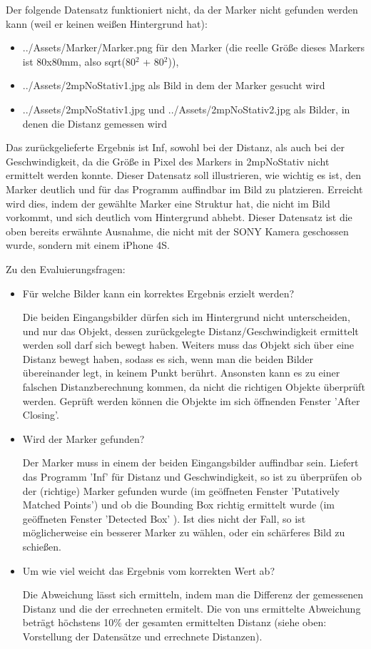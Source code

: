 \documentclass[deutsch]{scrartcl}
\begin{document}
Der folgende Datensatz funktioniert nicht, da der Marker nicht gefunden werden kann (weil er keinen weißen Hintergrund hat):
\begin{itemize}
	\item ../Assets/Marker/Marker.png für den Marker (die reelle Größe dieses Markers ist 80x80mm, also sqrt(80$^2$ + 80$^2$)), 
	\item ../Assets/2mpNoStativ1.jpg als Bild in dem der Marker gesucht wird
	\item ../Assets/2mpNoStativ1.jpg und ../Assets/2mpNoStativ2.jpg als Bilder, in denen die Distanz gemessen wird
\end{itemize}
Das zurückgelieferte Ergebnis ist Inf, sowohl bei der Distanz, als auch bei der Geschwindigkeit, da die Größe in Pixel des Markers in 2mpNoStativ nicht ermittelt werden konnte. Dieser Datensatz soll illustrieren, wie wichtig es ist, den Marker deutlich und für das Programm auffindbar im Bild zu platzieren. Erreicht wird dies, indem der gewählte Marker eine Struktur hat, die nicht im Bild vorkommt, und sich deutlich vom Hintergrund abhebt.
Dieser Datensatz ist die oben bereits erwähnte Ausnahme, die nicht mit der SONY Kamera geschossen wurde, sondern mit einem iPhone 4S.

Zu den Evaluierungsfragen:

\begin{itemize}
	\item Für welche Bilder kann ein korrektes Ergebnis erzielt werden? 
	
	Die beiden Eingangsbilder dürfen sich im Hintergrund nicht unterscheiden, und nur das Objekt, dessen zurückgelegte Distanz/Geschwindigkeit ermittelt werden soll darf sich bewegt haben. Weiters muss das Objekt sich über eine Distanz bewegt haben, sodass es sich, wenn man die beiden Bilder übereinander legt, in keinem Punkt berührt. Ansonsten kann es zu einer falschen Distanzberechnung kommen, da nicht die richtigen Objekte überprüft werden. Geprüft werden können die Objekte im sich öffnenden Fenster 'After Closing'.
	\item Wird der Marker gefunden? 
	
	Der Marker muss in einem der beiden Eingangsbilder auffindbar sein. Liefert das Programm 'Inf' für Distanz und Geschwindigkeit, so ist zu überprüfen ob der (richtige) Marker gefunden wurde (im geöffneten Fenster 'Putatively Matched Points') und ob die Bounding Box richtig ermittelt wurde (im geöffneten Fenster 'Detected Box' ). Ist dies nicht der Fall, so ist möglicherweise ein besserer Marker zu wählen, oder ein schärferes Bild zu schießen.
	\item Um wie viel weicht das Ergebnis vom korrekten Wert ab? 
	
	Die Abweichung lässt sich ermitteln, indem man die Differenz der gemessenen Distanz und die der errechneten ermitelt. Die von uns ermittelte Abweichung beträgt höchstens 10\% der gesamten ermittelten Distanz (siehe oben: Vorstellung der Datensätze und errechnete Distanzen).
\end{itemize}
\end{document}
